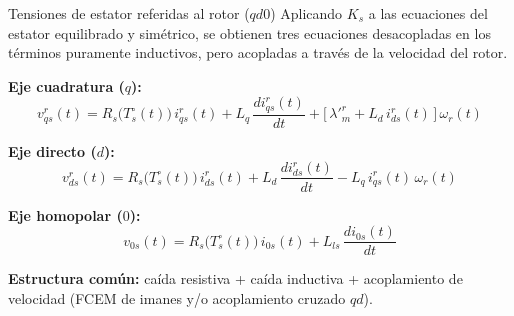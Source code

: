 \documentclass[aspectratio=169,t]{beamer}
\begin{document}
\begin{frame}{Tensiones de estator referidas al rotor ($qd0$)}
{\small\color{uncGray}Aplicando $K_s$ a las ecuaciones del estator equilibrado y simétrico, se obtienen tres ecuaciones desacopladas en los términos puramente inductivos, pero acopladas a través de la velocidad del rotor.}\par
\vspace{3mm}

\textbf{Eje cuadratura ($q$):}
\begin{equation*}
v^{r}_{qs}(t) = R_s\!\big(T_s^\circ(t)\big)\,i^{r}_{qs}(t) + L_q\,\frac{d i^{r}_{qs}(t)}{dt} + \big[\,\lambda'^r_m + L_d\,i^{r}_{ds}(t)\,\big]\,\omega_r(t)
\end{equation*}

\textbf{Eje directo ($d$):}
\begin{equation*}
v^{r}_{ds}(t) = R_s\!\big(T_s^\circ(t)\big)\,i^{r}_{ds}(t) + L_d\,\frac{d i^{r}_{ds}(t)}{dt} - L_q\,i^{r}_{qs}(t)\,\omega_r(t)
\end{equation*}

\textbf{Eje homopolar ($0$):}
\begin{equation*}
v_{0s}(t) = R_s\!\big(T_s^\circ(t)\big)\,i_{0s}(t) + L_{ls}\,\frac{d i_{0s}(t)}{dt}
\end{equation*}

\vspace{1mm}
{\small \textbf{Estructura común:} caída resistiva + caída inductiva + acoplamiento de velocidad (FCEM de imanes y/o acoplamiento cruzado $qd$).}
\end{frame}
\end{document}
